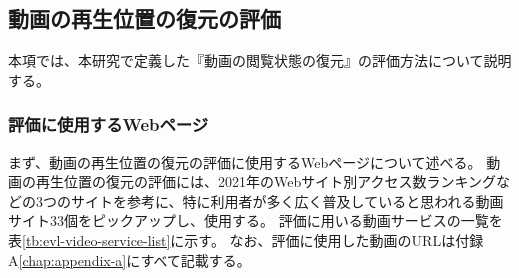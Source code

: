 \subsection{動画の再生位置の復元の評価}
本項では、本研究で定義した『動画の閲覧状態の復元』の評価方法について説明する。

\subsubsection{評価に使用するWebページ}
まず、動画の再生位置の復元の評価に使用するWebページについて述べる。
動画の再生位置の復元の評価には、2021年のWebサイト別アクセス数ランキング\cite{The-50-Most-Visited-Websites-in-the-World}などの3つのサイト\cite{mmd-video-research}\cite{popular-video-service}を参考に、特に利用者が多く広く普及していると思われる動画サイト33個をピックアップし、使用する。
評価に用いる動画サービスの一覧を表\ref{tb:evl-video-service-list}に示す。
なお、評価に使用した動画のURLは付録A\ref{chap:appendix-a}にすべて記載する。


